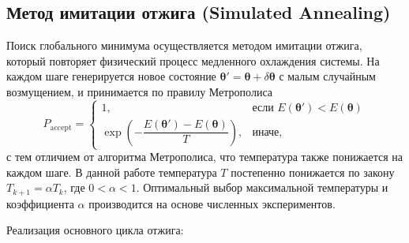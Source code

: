 \documentclass[a4paper]{report}
\begin{document}
\subsection{Метод имитации отжига (Simulated Annealing)}

Поиск глобального минимума осуществляется методом имитации отжига, который повторяет физический процесс медленного охлаждения системы. На каждом шаге генерируется новое состояние $\bm\theta' = \bm\theta + \delta\bm\theta$ с малым случайным возмущением, и принимается по правилу Метрополиса
\begin{equation}
    P_{\text{accept}} =
    \begin{cases}
        1, & \text{если } E(\bm\theta') < E(\bm\theta) \\
        \exp\left(-\dfrac{E(\bm\theta')-E(\bm\theta)}{T}\right), & \text{иначе},
    \end{cases}
\end{equation}
с тем отличием от алгоритма Метрополиса, что температура также понижается на каждом шаге. В данной работе температура $T$ постепенно понижается по закону $T_{k+1} = \alpha T_k$, где $0 < \alpha < 1$. Оптимальный выбор максимальной температуры и коэффициента $\alpha$ производится на основе численных экспериментов.

Реализация основного цикла отжига:
\end{document}
